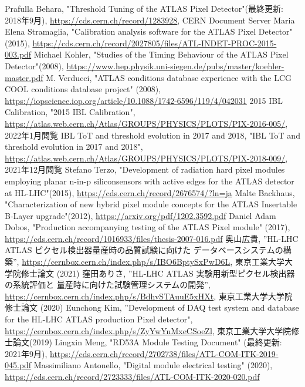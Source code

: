 \begin{thebibliography}{24}
Prafulla Behara, "Threshold Tuning of the ATLAS Pixel Detector"(最終更新: 2018年9月), \url{https://cds.cern.ch/record/1283928}, CERN Document Server
Maria Elena Stramaglia, "Calibration analysis software for the ATLAS Pixel Detector" (2015), \url{https://cds.cern.ch/record/2027805/files/ATL-INDET-PROC-2015-003.pdf}
Michael Kohler, "Studies of the Timing Behaviour of the ATLAS Pixel Detector"(2008), \url{https://www.hep.physik.uni-siegen.de/pubs/master/koehler-master.pdf}
M. Verducci, "ATLAS conditions database experience with the LCG COOL conditions database project" (2008),
\url{https://iopscience.iop.org/article/10.1088/1742-6596/119/4/042031}
2015 IBL Calibration, "2015 IBL Calibration", \url{https://atlas.web.cern.ch/Atlas/GROUPS/PHYSICS/PLOTS/PIX-2016-005/}, 2022年1月閲覧
IBL ToT and threshold evolution in 2017 and 2018, "IBL ToT and threshold evolution in 2017 and 2018", \url{https://atlas.web.cern.ch/Atlas/GROUPS/PHYSICS/PLOTS/PIX-2018-009/}, 2021年12月閲覧
Stefano Terzo, "Development of radiation hard pixel modules employing planar n-in-p siliconsensors with active edges for the ATLAS detector at HL-LHC"(2015), \url{https://cds.cern.ch/record/2676574/?ln=ja}
Malte Backhaus, "Characterization of new hybrid pixel module concepts for the ATLAS Insertable B-Layer upgrade"(2012), \url{https://arxiv.org/pdf/1202.3592.pdf}
Daniel Adam Dobos, "Production accompanying testing of the ATLAS Pixel module" (2017),
\url{https://cds.cern.ch/record/1016933/files/thesis-2007-016.pdf}
奥山広貴, ”HL-LHC ATLAS ピクセル検出器量産時の品質試験に向けた データベースシステムの構築”,
\url{https://cernbox.cern.ch/index.php/s/IBO6BptySxPwD6L}, 東京工業大学大学院修士論文 (2021)
窪田ありさ, ”HL-LHC ATLAS 実験用新型ピクセル検出器の系統評価と 量産時に向けた試験管理システムの開発”,
\url{https://cernbox.cern.ch/index.php/s/BdhvSTAuuE5xHXt}, 東京工業大学大学院修士論文 (2020)
Eunchong Kim, ”Development of DAQ test system and database for the HL-LHC ATLAS production Pixel detector",
\url{https://cernbox.cern.ch/index.php/s/ZyYwYnMxeCSoeZl}, 東京工業大学大学院修士論文(2019)
Lingxin Meng, "RD53A Module Testing Document" (最終更新: 2021年9月),
\url{https://cds.cern.ch/record/2702738/files/ATL-COM-ITK-2019-045.pdf}
Massimiliano Antonello, "Digital module electrical testing" (2020),
\url{https://cds.cern.ch/record/2723333/files/ATL-COM-ITK-2020-020.pdf}

\end{thebibliography}
